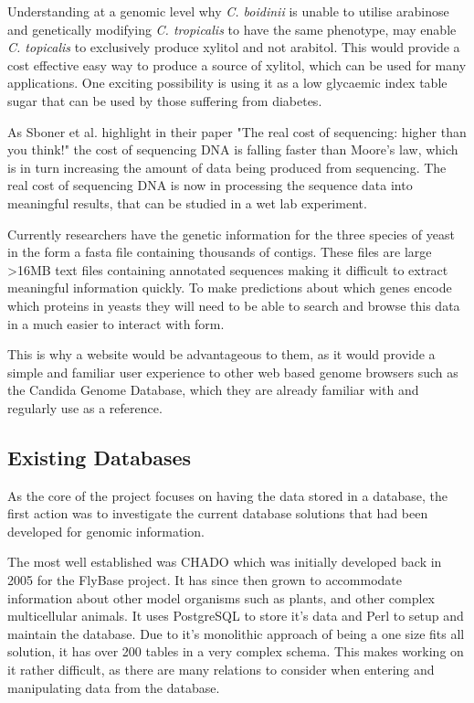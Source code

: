 Understanding at a genomic level why \textit{C. boidinii} is unable to utilise arabinose and genetically modifying \textit{C. tropicalis} to have the same phenotype, may enable \textit{C. topicalis} to exclusively produce xylitol and not arabitol. This would provide a cost effective easy way to produce a source of xylitol, which can be used for many applications. One exciting possibility is using it as a low glycaemic index table sugar that can be used by those suffering from diabetes.

As Sboner et al. highlight in their paper "The real cost of sequencing: higher than you think!"\cite{sequencingcost} the cost of sequencing DNA is falling faster than Moore's law, which is in turn increasing the amount of data being produced from sequencing. The real cost of sequencing DNA is now in processing the sequence data into meaningful results, that can be studied in a wet lab experiment. 

Currently researchers have the genetic information for the three species of yeast in the form a fasta file containing thousands of contigs. These files are large \textgreater 16MB text files containing annotated sequences making it difficult to extract meaningful information quickly. To make predictions about which genes encode which proteins in yeasts they will need to be able to search and browse this data in a much easier to interact with form. 

This is why a website would be advantageous to them, as it would provide a simple and familiar user experience to other web based genome browsers such as the Candida Genome Database\cite{cgd}, which they are already familiar with and regularly use as a reference. 

\subsection{Existing Databases}
As the core of the project focuses on having the data stored in a database, the first action was to investigate the current database solutions that had been developed for genomic information. 

The most well established was CHADO\cite{chado} which was initially developed back in 2005 for the FlyBase\cite{flybase} project. It has since then grown to accommodate information about other model organisms such as plants, and other complex multicellular animals. It uses PostgreSQL\cite{postgres} to store it's data and Perl\cite{perl} to setup and maintain the database. Due to it's monolithic approach of being a one size fits all solution, it has over 200 tables in a very complex schema. This makes working on it rather difficult, as there are many relations to consider when entering and manipulating data from the database.

